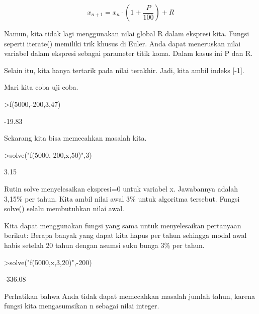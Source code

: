 \documentclass[a4paper,10pt]{article}
\begin{document}
\begin{eulernotebook}
\begin{eulercomment}
\begin{eulercomment}
\begin{eulercomment}
\begin{eulercomment}
\begin{eulercomment}
\begin{eulercomment}
\begin{eulercomment}
\begin{eulercomment}
\begin{eulercomment}
\end{eulercomment}
\begin{eulerformula}
\[
x_{n+1} = x_n \cdot \left(1+ \frac{P}{100}\right) + R
\]
\end{eulerformula}
\begin{eulercomment}
Namun, kita tidak lagi menggunakan nilai global R dalam ekspresi kita.
Fungsi seperti iterate() memiliki trik khusus di Euler. Anda dapat
meneruskan nilai variabel dalam ekspresi sebagai parameter titik koma.
Dalam kasus ini P dan R.

Selain itu, kita hanya tertarik pada nilai terakhir. Jadi, kita ambil
indeks [-1].

Mari kita coba uji coba.
\end{eulercomment}
\begin{eulerprompt}
>f(5000,-200,3,47)
\end{eulerprompt}
\begin{euleroutput}
       -19.83 
\end{euleroutput}
\begin{eulercomment}
Sekarang kita bisa memecahkan masalah kita.
\end{eulercomment}
\begin{eulerprompt}
>solve("f(5000,-200,x,50)",3)
\end{eulerprompt}
\begin{euleroutput}
         3.15 
\end{euleroutput}
\begin{eulercomment}
Rutin solve menyelesaikan ekspresi=0 untuk variabel x. Jawabannya
adalah 3,15\% per tahun. Kita ambil nilai awal 3\% untuk algoritma
tersebut. Fungsi solve() selalu membutuhkan nilai awal.

Kita dapat menggunakan fungsi yang sama untuk menyelesaikan pertanyaan
berikut: Berapa banyak yang dapat kita hapus per tahun sehingga modal
awal habis setelah 20 tahun dengan asumsi suku bunga 3\% per tahun.
\end{eulercomment}
\begin{eulerprompt}
>solve("f(5000,x,3,20)",-200)
\end{eulerprompt}
\begin{euleroutput}
      -336.08 
\end{euleroutput}
\begin{eulercomment}
Perhatikan bahwa Anda tidak dapat memecahkan masalah jumlah tahun,
karena fungsi kita mengasumsikan n sebagai nilai integer.


\end{eulercomment}
\end{eulercomment}
\end{eulercomment}
\end{eulercomment}
\end{eulercomment}
\end{eulercomment}
\end{eulercomment}
\end{eulercomment}
\end{eulercomment}
\end{eulernotebook}
\end{document}

